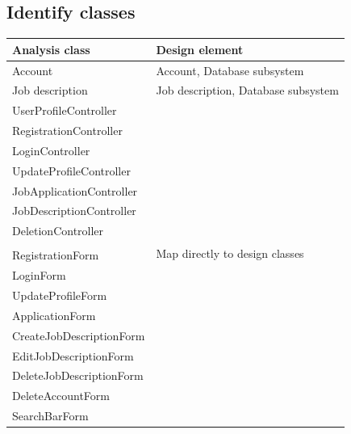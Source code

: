 \documentclass[a4paper]{article}
\begin{document}
\subsection{Identify classes}
\begin{center}
    \begin{tabular} { | l | l | }
        \hline
        \textbf{Analysis class}  & \textbf{Design element}                          \\
        \hline
        Account                  & Account, Database subsystem                      \\
        \hline
        Job description          & Job description, Database subsystem              \\
        \hline
        UserProfileController    & \multirow{16}{*}{Map directly to design classes} \\
        \cline{1-1}
        RegistrationController   &                                                  \\
        \cline{1-1}
        LoginController          &                                                  \\
        \cline{1-1}
        UpdateProfileController  &                                                  \\
        \cline{1-1}
        JobApplicationController &                                                  \\
        \cline{1-1}
        JobDescriptionController &                                                  \\
        \cline{1-1}
        DeletionController       &                                                  \\
        \cline{1-1}              &                                                  \\
        RegistrationForm         &                                                  \\
        \cline{1-1}
        LoginForm                &                                                  \\
        \cline{1-1}
        UpdateProfileForm        &                                                  \\
        \cline{1-1}
        ApplicationForm          &                                                  \\
        \cline{1-1}
        CreateJobDescriptionForm &                                                  \\
        \cline{1-1}
        EditJobDescriptionForm   &                                                  \\
        \cline{1-1}
        DeleteJobDescriptionForm &                                                  \\
        \cline{1-1}
        DeleteAccountForm        &                                                  \\
        \cline{1-1}
        SearchBarForm            &                                                  \\
        \hline
    \end{tabular}
\end{center}
\end{document}

